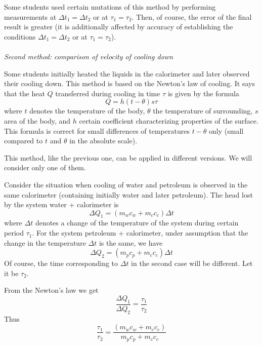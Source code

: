 \documentclass[12pt,a4paper]{book}
\begin{document}
	Some students used certain mutations of this method by performing measurements at $\Delta t_1=\Delta t_2$ or at $\tau_1=\tau_2$. Then, of course, the error of the final result is greater (it is additionally af\mbox{}fected by accuracy of establishing the conditions $\Delta t_1=\Delta t_2$ or at $\tau_1=\tau_2$).\\ \\
	\noindent\emph{Second method: comparison of velocity of cooling down}\par
	Some students initially heated the liquids in the calorimeter and later observed their cooling down. This method is based on the Newton's law of cooling. It says that the heat $Q$ transferred during cooling in time $\tau$ is given by the formula
	\begin{equation*}
		Q=h(t-\theta)s\tau
	\end{equation*}
	where $t$ denotes the temperature of the body, $\theta$ the temperature of surrounding, $s$ area of the body, and $h$ certain coef\mbox{}f\mbox{}icient characterizing properties of the surface. This formula is correct for small dif\mbox{}ferences of temperatures $t-\theta$ only (small compared to $t$ and $\theta$ in the absolute scale).\par
	This method, like the previous one, can be applied in dif\mbox{}ferent versions. We will consider only one of them.\par
	Consider the situation when cooling of water and petroleum is observed in the same calorimeter (containing initially water and later petroleum). The head lost by the system water + calorimeter is
	\begin{equation*}
		\Delta Q_1=(m_wc_w+m_cc_c)\Delta t
	\end{equation*}
	where $\Delta t$ denotes a change of the temperature of the system during certain period $\tau_1$. For the system petroleum + calorimeter, under assumption that the change in the temperature $\Delta t$ is the same, we have
	\begin{equation*}
		\Delta Q_2=(m_pc_p+m_cc_c)\Delta t
	\end{equation*}
	Of course, the time corresponding to $\Delta t$ in the second case will be dif\mbox{}ferent. Let it be $\tau_2$.\par
	From the Newton's law we get
	\begin{equation*}
		\frac{\Delta Q_1}{\Delta Q_2}=\frac{\tau_1}{\tau_2}
	\end{equation*}
	Thus
	\begin{equation*}
		\frac{\tau_1}{\tau_2}=\frac{(m_wc_w+m_cc_c)}{m_pc_p+m_cc_c}
	\end{equation*}
\end{document}
